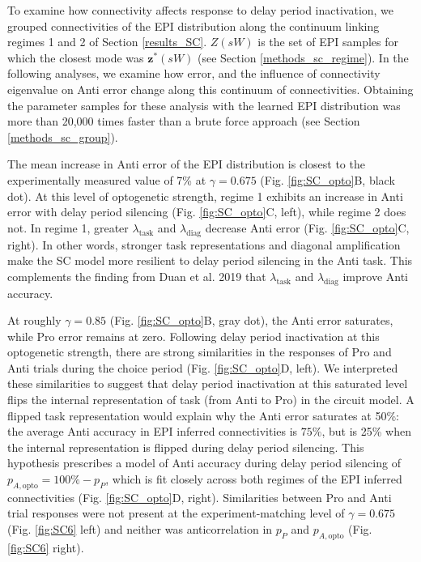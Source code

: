 \documentclass[11pt]{article}
\begin{document}
To examine how connectivity affects response to delay period inactivation, we grouped connectivities of the EPI distribution along the continuum linking regimes 1 and 2 of Section \ref{results_SC}.
$Z(sW)$ is the set of EPI samples for which the closest mode was $\mathbf{z}^*(sW)$ (see Section \ref{methods_sc_regime}).
In the following analyses, we examine how error, and the influence of connectivity eigenvalue on Anti error change along this continuum of connectivities.
Obtaining the parameter samples for these analysis with the learned EPI distribution was more than 20,000 times faster than a brute force approach (see Section \ref{methods_sc_group}).

The mean increase in Anti error of the EPI distribution is closest to the experimentally measured value of 7\% at $\gamma = 0.675$ (Fig. \ref{fig:SC_opto}B, black dot).
At this level of optogenetic strength, regime 1 exhibits an increase in Anti error with delay period silencing (Fig. \ref{fig:SC_opto}C, left), while regime 2 does not.
In regime 1, greater $\lambda_{\text{task}}$ and $\lambda_{\text{diag}}$ decrease Anti error (Fig. \ref{fig:SC_opto}C, right).
In other words, stronger task representations and diagonal amplification make the SC model more resilient to delay period silencing in the Anti task.
This complements the finding from Duan et al. 2019 \cite{duan2019collicular} that $\lambda_{\text{task}}$ and $\lambda_{\text{diag}}$ improve Anti accuracy.

At roughly $\gamma = 0.85$ (Fig. \ref{fig:SC_opto}B, gray dot), the Anti error saturates, while Pro error remains at zero.
Following delay period inactivation at this optogenetic strength, there are strong similarities in the responses of Pro and Anti trials during the choice period (Fig. \ref{fig:SC_opto}D, left).
We interpreted these similarities to suggest that delay period inactivation at this saturated level flips the internal representation of task (from Anti to Pro) in the circuit model.
A flipped task representation would explain why the Anti error saturates at 50\%: the average Anti accuracy in EPI inferred connectivities is $75\%$, but is 25\% when the internal representation is flipped during delay period silencing.
This hypothesis prescribes a model of Anti accuracy during delay period silencing of $p_{A,\text{opto}} = 100\% - p_P$, which is fit closely across both regimes of the EPI inferred connectivities (Fig. \ref{fig:SC_opto}D, right).
Similarities between Pro and Anti trial responses were not present at the experiment-matching level of $\gamma=0.675$ (Fig. \ref{fig:SC6} left) and neither was anticorrelation in $p_P$ and $p_{A,\text{opto}}$ (Fig. \ref{fig:SC6} right).
\end{document}
